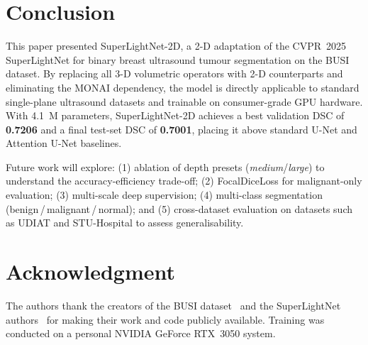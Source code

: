 \documentclass[conference]{IEEEtran}
\begin{document}
\section{Conclusion}

This paper presented SuperLightNet-2D, a 2-D adaptation of the
CVPR~2025 SuperLightNet for binary breast ultrasound tumour
segmentation on the BUSI dataset. By replacing all 3-D volumetric
operators with 2-D counterparts and eliminating the MONAI dependency,
the model is directly applicable to standard single-plane ultrasound
datasets and trainable on consumer-grade GPU hardware. With 4.1~M
parameters, SuperLightNet-2D achieves a best validation DSC of
\textbf{0.7206} and a final test-set DSC of \textbf{0.7001}, placing
it above standard U-Net and Attention U-Net baselines.

Future work will explore: (1) ablation of depth presets
(\textit{medium}/\textit{large}) to understand the accuracy-efficiency
trade-off; (2) FocalDiceLoss for malignant-only evaluation; (3)
multi-scale deep supervision; (4) multi-class segmentation
(benign\,/\,malignant\,/\,normal); and (5) cross-dataset evaluation
on datasets such as UDIAT and STU-Hospital to assess generalisability.

\section*{Acknowledgment}

The authors thank the creators of the BUSI
dataset~\cite{al2020dataset} and the SuperLightNet
authors~\cite{yu2025superlightnet} for making their work and code
publicly available. Training was conducted on a personal NVIDIA
GeForce RTX~3050 system.
\end{document}
